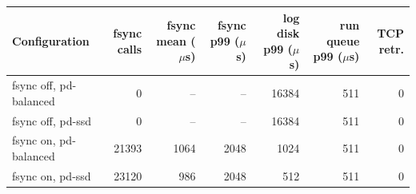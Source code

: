 \begin{tabular}{@{}lrrrrrr@{}}
\toprule
Configuration & fsync calls & fsync mean ($\mu$s) & fsync p99 ($\mu$s) & log disk p99 ($\mu$s) & run queue p99 ($\mu$s) & TCP retr. \\
\midrule
fsync off, pd-balanced & 0 & -- & -- & 16384 & 511 & 0 \\
fsync off, pd-ssd & 0 & -- & -- & 16384 & 511 & 0 \\
fsync on, pd-balanced & 21393 & 1064 & 2048 & 1024 & 511 & 0 \\
fsync on, pd-ssd & 23120 & 986 & 2048 & 512 & 511 & 0 \\
\bottomrule
\end{tabular}

